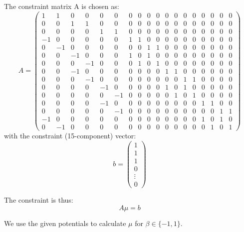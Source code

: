 \documentclass[12pt,a4paper]{scrartcl}
\begin{document}
The constraint matrix A is chosen as:
\begin{equation}
   A =
   \begin{pmatrix}
   1 & 1 & 0 & 0 & 0 & 0 & 0 & 0 & 0 & 0 & 0 & 0 & 0 & 0 & 0 & 0 & 0 & 0 \\
   0 & 0 & 1 & 1 & 0 & 0 & 0 & 0 & 0 & 0 & 0 & 0 & 0 & 0 & 0 & 0 & 0 & 0 \\
   0 & 0 & 0 & 0 & 1 & 1 & 0 & 0 & 0 & 0 & 0 & 0 & 0 & 0 & 0 & 0 & 0 & 0 \\
   -1 & 0 & 0 & 0 & 0 & 0 & 1 & 1 & 0 & 0 & 0 & 0 & 0 & 0 & 0 & 0 & 0 & 0 \\
   0 & -1 & 0 & 0 & 0 & 0 & 0 & 0 & 1 & 1 & 0 & 0 & 0 & 0 & 0 & 0 & 0 & 0 \\
   0 & 0 & -1 & 0 & 0 & 0 & 1 & 0 & 1 & 0 & 0 & 0 & 0 & 0 & 0 & 0 & 0 & 0 \\
   0 & 0 & 0 & -1 & 0 & 0 & 0 & 1 & 0 & 1 & 0 & 0 & 0 & 0 & 0 & 0 & 0 & 0 \\
   0 & 0 & -1 & 0 & 0 & 0 & 0 & 0 & 0 & 0 & 1 & 1 & 0 & 0 & 0 & 0 & 0 & 0 \\
   0 & 0 & 0 & -1 & 0 & 0 & 0 & 0 & 0 & 0 & 0 & 0 & 1 & 1 & 0 & 0 & 0 & 0 \\
   0 & 0 & 0 & 0 & -1 & 0 & 0 & 0 & 0 & 0 & 1 & 0 & 1 & 0 & 0 & 0 & 0 & 0 \\
   0 & 0 & 0 & 0 & 0 & -1 & 0 & 0 & 0 & 0 & 0 & 1 & 0 & 1 & 0 & 0 & 0 & 0 \\
   0 & 0 & 0 & 0 & -1 & 0 & 0 & 0 & 0 & 0 & 0 & 0 & 0 & 0 & 1 & 1 & 0 & 0 \\
   0 & 0 & 0 & 0 & 0 & -1 & 0 & 0 & 0 & 0 & 0 & 0 & 0 & 0 & 0 & 0 & 1 & 1 \\
   -1 & 0 & 0 & 0 & 0 & 0 & 0 & 0 & 0 & 0 & 0 & 0 & 0 & 0 & 1 & 0 & 1 & 0 \\
   0 & -1 & 0 & 0 & 0 & 0 & 0 & 0 & 0 & 0 & 0 & 0 & 0 & 0 & 0 & 1 & 0 & 1
   \end{pmatrix}
\end{equation}
with the constraint (15-component) vector:
\[
  b = 
  \begin{pmatrix}
    1 \\
    1 \\
    1 \\
    0 \\
    \vdots \\
    0
  \end{pmatrix}
\]

The constraint is thus:
\[
  A \mu = b
\]

We use the given potentials to calculate $\mu$ for $\beta \in \{-1,1\}$.
\end{document}
